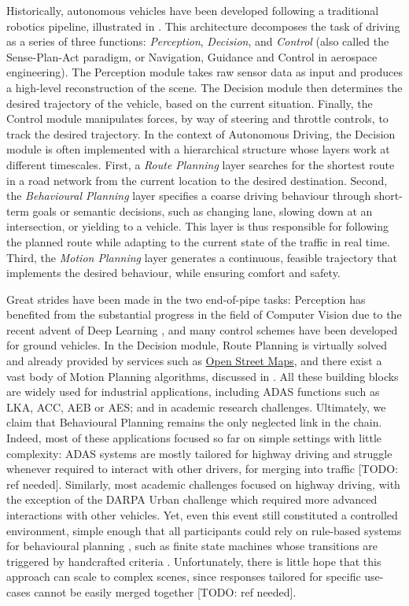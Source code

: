Historically, autonomous vehicles have been developed following a traditional robotics pipeline, illustrated in . This architecture decomposes the task of driving as a series of three functions: \emph{Perception}, \emph{Decision}, and \emph{Control} (also called the Sense-Plan-Act paradigm, or Navigation, Guidance and Control in aerospace engineering). The {Perception} module takes raw sensor data as input and produces a high-level reconstruction of the scene. The {Decision} module then determines the desired trajectory of the vehicle, based on the current situation. Finally, the {Control} module manipulates forces, by way of steering and throttle controls, to track the desired trajectory. In the context of Autonomous Driving, the Decision module is often implemented with a hierarchical structure whose layers work at different timescales. First, a \emph{Route Planning} layer searches for the shortest route in a road network from the current location to the desired destination. Second, the \emph{Behavioural Planning} layer specifies a coarse driving behaviour through short-term goals or semantic decisions, such as changing lane, slowing down at an intersection, or yielding to a vehicle. This layer is thus responsible for following the planned route while adapting to the current state of the traffic in real time. Third, the \emph{Motion Planning} layer generates a continuous, feasible trajectory that implements the desired behaviour, while ensuring comfort and safety.

Great strides have been made in the two end-of-pipe tasks: Perception has benefited from the substantial progress in the field of Computer Vision due to the recent advent of Deep Learning \citep[surveyed in][]{janai2017computer}, and many control schemes \citep[surveyed in][]{Polack2018} have been developed for ground vehicles. In the Decision module, Route Planning is virtually solved and already provided by services such as \href{https://wiki.openstreetmap.org/wiki/Routing}{Open Street Maps}, and there exist a vast body of Motion Planning algorithms, discussed in . All these building blocks are widely used for industrial applications, including \ac{ADAS} functions such as \ac{LKA}, \ac{ACC}, \ac{AEB} or \ac{AES}; and in academic research challenges. Ultimately, we claim that Behavioural Planning remains the only neglected link in the chain. Indeed, most of these applications focused so far on simple settings with little complexity: \ac*{ADAS} systems are mostly tailored for highway driving and struggle whenever required to interact with other drivers, \eg for merging into traffic [TODO: ref needed]. Similarly, most academic challenges focused on highway driving, with the exception of the DARPA Urban challenge which required more advanced interactions with other vehicles. Yet, even this event still constituted a controlled environment, simple enough that all participants could rely on rule-based systems for behavioural planning \citep{Buehler2009}, such as finite state machines whose transitions are triggered by handcrafted criteria \citep[\eg][]{Baker2008}. Unfortunately, there is little hope that this approach can scale to complex scenes, since responses tailored for specific use-cases cannot be easily merged together [TODO: ref needed].

